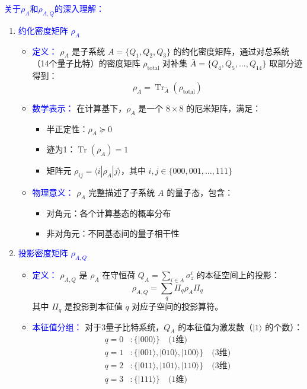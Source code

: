 \documentclass[11pt,a4paper]{article}
\begin{document}
\textcolor{blue}{关于$\rho_A$和$\rho_{A, Q}$的深入理解：}
\begin{enumerate}
    \item \textcolor{blue}{约化密度矩阵 $\rho_A$}
    \begin{itemize}
        \item \textcolor{blue}{定义：} $\rho_A$ 是子系统 $A = \{Q_1, Q_2, Q_3\}$ 的约化密度矩阵，通过对总系统（14个量子比特）的密度矩阵 $\rho_{\text{total}}$ 对补集 $\bar{A} = \{Q_4, Q_5, \dots, Q_{14}\}$ 取部分迹得到：
        \begin{equation}
        \rho_A = \operatorname{Tr}_{\bar{A}} (\rho_{\text{total}})
        \end{equation}
        
        \item \textcolor{blue}{数学表示：} 在计算基下，$\rho_A$ 是一个 $8 \times 8$ 的厄米矩阵，满足：
        \begin{itemize}
            \item 半正定性：$\rho_A \succeq 0$
            \item 迹为1：$\operatorname{Tr}(\rho_A) = 1$
            \item 矩阵元 $\rho_{ij} = \langle i | \rho_A | j \rangle$，其中 $i,j \in \{000,001,\dots,111\}$
        \end{itemize}
        
        \item \textcolor{blue}{物理意义：} $\rho_A$ 完整描述了子系统 $A$ 的量子态，包含：
        \begin{itemize}
            \item 对角元：各个计算基态的概率分布
            \item 非对角元：不同基态间的量子相干性
        \end{itemize}
    \end{itemize}
    
    \item \textcolor{blue}{投影密度矩阵 $\rho_{A,Q}$}
    \begin{itemize}
        \item \textcolor{blue}{定义：} $\rho_{A,Q}$ 是 $\rho_A$ 在守恒荷 $Q_A = \sum_{i\in A} \sigma_z^i$ 的本征空间上的投影：
        \begin{equation}
        \rho_{A,Q} = \sum_{q} \Pi_q \rho_A \Pi_q
        \end{equation}
        其中 $\Pi_q$ 是投影到本征值 $q$ 对应子空间的投影算符。
        
        \item \textcolor{blue}{本征值分组：} 对于3量子比特系统，$Q_A$ 的本征值为激发数（$|1\rangle$ 的个数）：
        \begin{align*}
        q = 0 &: \{|000\rangle\} \quad \text{(1维)} \\
        q = 1 &: \{|001\rangle, |010\rangle, |100\rangle\} \quad \text{(3维)} \\
        q = 2 &: \{|011\rangle, |101\rangle, |110\rangle\} \quad \text{(3维)} \\
        q = 3 &: \{|111\rangle\} \quad \text{(1维)}
        \end{align*}
        

\end{itemize}
\end{enumerate}
\end{document}
